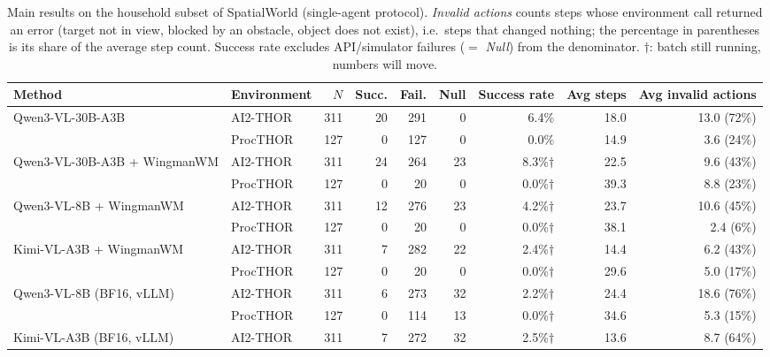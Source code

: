 \begin{table}[t]
  \centering
  \caption{Main results on the household subset of SpatialWorld (single-agent protocol). \emph{Invalid actions} counts steps whose environment call returned an error (target not in view, blocked by an obstacle, object does not exist), i.e.\ steps that changed nothing; the percentage in parentheses is its share of the average step count. Success rate excludes API/simulator failures ($=$ \emph{Null}) from the denominator. $\dagger$: batch still running, numbers will move.}
  \label{tab:main-results}
  \small
  \setlength{\tabcolsep}{4pt}
  \begin{tabular}{llrrrrrrr}
    \toprule
    Method & Environment & $N$ & Succ. & Fail. & Null & Success rate & Avg steps & Avg invalid actions \\
    \midrule
    \multirow{2}{*}{Qwen3-VL-30B-A3B} & AI2-THOR & 311 & 20 & 291 & 0 & 6.4\% & 18.0 & 13.0 (72\%) \\
     & ProcTHOR & 127 & 0 & 127 & 0 & 0.0\% & 14.9 & 3.6 (24\%) \\
    \cmidrule(l){1-9}
    \multirow{2}{*}{Qwen3-VL-30B-A3B + WingmanWM} & AI2-THOR & 311 & 24 & 264 & 23 & 8.3\%$\dagger$ & 22.5 & 9.6 (43\%) \\
     & ProcTHOR & 127 & 0 & 20 & 0 & 0.0\%$\dagger$ & 39.3 & 8.8 (23\%) \\
    \cmidrule(l){1-9}
    \multirow{2}{*}{Qwen3-VL-8B + WingmanWM} & AI2-THOR & 311 & 12 & 276 & 23 & 4.2\%$\dagger$ & 23.7 & 10.6 (45\%) \\
     & ProcTHOR & 127 & 0 & 20 & 0 & 0.0\%$\dagger$ & 38.1 & 2.4 (6\%) \\
    \cmidrule(l){1-9}
    \multirow{2}{*}{Kimi-VL-A3B + WingmanWM} & AI2-THOR & 311 & 7 & 282 & 22 & 2.4\%$\dagger$ & 14.4 & 6.2 (43\%) \\
     & ProcTHOR & 127 & 0 & 20 & 0 & 0.0\%$\dagger$ & 29.6 & 5.0 (17\%) \\
    \cmidrule(l){1-9}
    \multirow{2}{*}{Qwen3-VL-8B (BF16, vLLM)} & AI2-THOR & 311 & 6 & 273 & 32 & 2.2\%$\dagger$ & 24.4 & 18.6 (76\%) \\
     & ProcTHOR & 127 & 0 & 114 & 13 & 0.0\%$\dagger$ & 34.6 & 5.3 (15\%) \\
    \cmidrule(l){1-9}
    \multirow{2}{*}{Kimi-VL-A3B (BF16, vLLM)} & AI2-THOR & 311 & 7 & 272 & 32 & 2.5\%$\dagger$ & 13.6 & 8.7 (64\%) \\

\end{tabular}
\end{table}

